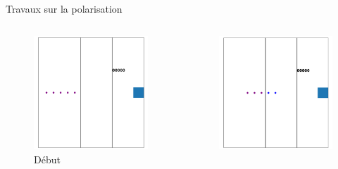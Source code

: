 \documentclass[french]{beamer}
\begin{document}
\begin{frame}{Travaux sur la polarisation}
    \begin{columns}
        \begin{column}{0.5\textwidth}
            \begin{figure}
                \captionsetup{labelformat=empty}
                \includegraphics[scale=0.05]{Debut.png}
                \caption{\small Début}
            \end{figure}
        \end{column}
        \begin{column}{0.5\textwidth}
            \begin{figure}
                \captionsetup{labelformat=empty}
                \includegraphics[scale=0.05]{Filtre1.png}

\end{figure}
\end{column}
\end{columns}
\end{frame}
\end{document}

